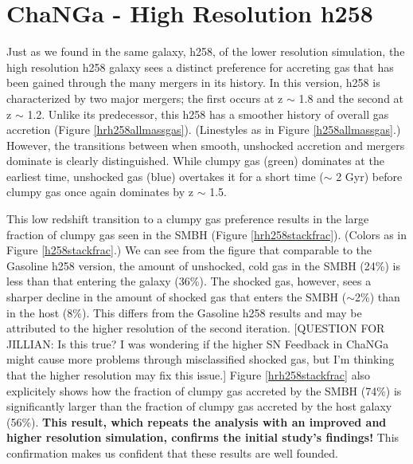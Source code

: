 \documentclass[12pt,headA,chapB]{fiskthesis}
\begin{document}
\section{ChaNGa - High Resolution h258}

Just as we found in the same galaxy, h258, of the lower resolution simulation, the high resolution h258 galaxy sees a distinct preference for accreting gas that has been gained through the many mergers in its history. In this version, h258 is characterized by two major mergers; the first occurs at z $\sim$ 1.8 and the second at z $\sim$ 1.2. Unlike its predecessor, this h258 has a smoother history of overall gas accretion (Figure \ref{hrh258allmassgas}). (Linestyles as in Figure \ref{h258allmassgas}.) However, the transitions between when smooth, unshocked accretion and mergers dominate is clearly distinguished. While clumpy gas (green) dominates at the earliest time, unshocked gas (blue) overtakes it for a short time ($\sim$ 2 Gyr) before clumpy gas once again dominates by z $\sim$ 1.5. 

This low redshift transition to a clumpy gas preference results in the large fraction of clumpy gas seen in the SMBH (Figure \ref{hrh258stackfrac}). (Colors as in Figure \ref{h258stackfrac}.) We can see from the figure that comparable to the Gasoline h258 version, the amount of unshocked, cold gas in the SMBH (24\%) is less than that entering the galaxy (36\%). The shocked gas, however, sees a sharper decline in the amount of shocked gas that enters the SMBH ($\sim$2\%) than in the host (8\%). This differs from the Gasoline h258 results and may be attributed to the higher resolution of the second iteration. [QUESTION FOR JILLIAN: Is this true? I was wondering if the higher SN Feedback in ChaNGa might cause more problems through misclassified shocked gas, but I'm thinking that the higher resolution may fix this issue.] Figure \ref{hrh258stackfrac} also explicitely shows how the fraction of clumpy gas accreted by the SMBH (74\%) is significantly larger than the fraction of clumpy gas accreted by the host galaxy (56\%).  \textbf{This result, which repeats the analysis with an improved and higher resolution simulation, confirms the initial study's findings!} This confirmation makes us confident that these results are well founded. 
\end{document}
